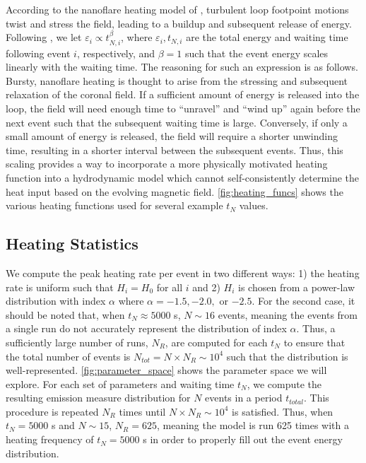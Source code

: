\documentclass[apj]{emulateapj}
\begin{document}
%
	\par According to the nanoflare heating model of \citet{parker_nanoflares_1988}, turbulent loop footpoint motions twist and stress the field, leading to a buildup and subsequent release of energy. Following \citet{cargill_active_2014}, we let $\varepsilon_i\propto t_{N,i}^{\beta}$, where $\varepsilon_i,t_{N,i}$ are the total energy and waiting time following event $i$, respectively, and $\beta=1$ such that the event energy scales linearly with the waiting time. The reasoning for such an expression is as follows. Bursty, nanoflare heating is thought to arise from the stressing and subsequent relaxation of the coronal field. If a sufficient amount of energy is released into the loop, the field will need enough time to ``unravel'' and ``wind up'' again before the next event such that the subsequent waiting time is large. Conversely, if only a small amount of energy is released, the field will require a shorter unwinding time, resulting in a shorter interval between the subsequent events. Thus, this scaling provides a way to incorporate a more physically motivated heating function into a hydrodynamic model which cannot self-consistently determine the heat input based on the evolving magnetic field. \autoref{fig:heating_funcs} shows the various heating functions used for several example $t_N$ values.
	\subsection{Heating Statistics}
	\label{subsec:heating_stats}
	\par We compute the peak heating rate per event in two different ways: 1) the heating rate is uniform such that $H_i=H_0$ for all $i$ and 2) $H_i$ is chosen from a power-law distribution with index $\alpha$ where $\alpha=-1.5,-2.0,$ or $-2.5$. For the second case, it should be noted that, when $t_N\approx5000$ s, $N\sim16$ events, meaning the events from a single run do not accurately represent the distribution of index $\alpha$. Thus, a sufficiently large number of runs, $N_{R}$, are computed for each $t_N$ to ensure that the total number of events is $N_{tot}=N\times N_{R}\sim10^4$ such that the distribution is well-represented. \autoref{fig:parameter_space} shows the parameter space we will explore. For each set of parameters and waiting time $t_N$, we compute the resulting emission measure distribution for $N$ events in a period $t_{total}$. This procedure is repeated $N_R$ times until $N\times N_R\sim10^4$ is satisfied. Thus, when $t_N=5000$ s and $N\sim15$, $N_R=625$, meaning the model is run 625 times with a heating frequency of $t_N=5000$ s in order to properly fill out the event energy distribution.
\end{document}
